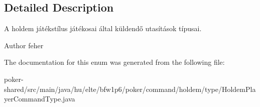 \subsection{Detailed Description}
A holdem játékstílus játékosai által küldendő utasítások típusai. \begin{DoxyAuthor}{Author}
feher 
\end{DoxyAuthor}


The documentation for this enum was generated from the following file\+:\begin{DoxyCompactItemize}
\item 
poker-\/shared/src/main/java/hu/elte/bfw1p6/poker/command/holdem/type/Holdem\+Player\+Command\+Type.\+java\end{DoxyCompactItemize}

